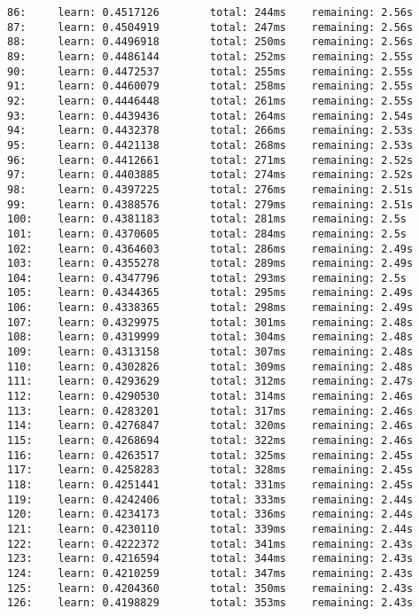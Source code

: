 \documentclass[11pt]{article}
\begin{document}
\begin{Verbatim}[commandchars=\\\{\}]
86:     learn: 0.4517126        total: 244ms    remaining: 2.56s
87:     learn: 0.4504919        total: 247ms    remaining: 2.56s
88:     learn: 0.4496918        total: 250ms    remaining: 2.56s
89:     learn: 0.4486144        total: 252ms    remaining: 2.55s
90:     learn: 0.4472537        total: 255ms    remaining: 2.55s
91:     learn: 0.4460079        total: 258ms    remaining: 2.55s
92:     learn: 0.4446448        total: 261ms    remaining: 2.55s
93:     learn: 0.4439436        total: 264ms    remaining: 2.54s
94:     learn: 0.4432378        total: 266ms    remaining: 2.53s
95:     learn: 0.4421138        total: 268ms    remaining: 2.53s
96:     learn: 0.4412661        total: 271ms    remaining: 2.52s
97:     learn: 0.4403885        total: 274ms    remaining: 2.52s
98:     learn: 0.4397225        total: 276ms    remaining: 2.51s
99:     learn: 0.4388576        total: 279ms    remaining: 2.51s
100:    learn: 0.4381183        total: 281ms    remaining: 2.5s
101:    learn: 0.4370605        total: 284ms    remaining: 2.5s
102:    learn: 0.4364603        total: 286ms    remaining: 2.49s
103:    learn: 0.4355278        total: 289ms    remaining: 2.49s
104:    learn: 0.4347796        total: 293ms    remaining: 2.5s
105:    learn: 0.4344365        total: 295ms    remaining: 2.49s
106:    learn: 0.4338365        total: 298ms    remaining: 2.49s
107:    learn: 0.4329975        total: 301ms    remaining: 2.48s
108:    learn: 0.4319999        total: 304ms    remaining: 2.48s
109:    learn: 0.4313158        total: 307ms    remaining: 2.48s
110:    learn: 0.4302826        total: 309ms    remaining: 2.48s
111:    learn: 0.4293629        total: 312ms    remaining: 2.47s
112:    learn: 0.4290530        total: 314ms    remaining: 2.46s
113:    learn: 0.4283201        total: 317ms    remaining: 2.46s
114:    learn: 0.4276847        total: 320ms    remaining: 2.46s
115:    learn: 0.4268694        total: 322ms    remaining: 2.46s
116:    learn: 0.4263517        total: 325ms    remaining: 2.45s
117:    learn: 0.4258283        total: 328ms    remaining: 2.45s
118:    learn: 0.4251441        total: 331ms    remaining: 2.45s
119:    learn: 0.4242406        total: 333ms    remaining: 2.44s
120:    learn: 0.4234173        total: 336ms    remaining: 2.44s
121:    learn: 0.4230110        total: 339ms    remaining: 2.44s
122:    learn: 0.4222372        total: 341ms    remaining: 2.43s
123:    learn: 0.4216594        total: 344ms    remaining: 2.43s
124:    learn: 0.4210259        total: 347ms    remaining: 2.43s
125:    learn: 0.4204360        total: 350ms    remaining: 2.43s
126:    learn: 0.4198829        total: 353ms    remaining: 2.43s

\end{Verbatim}
\end{document}
